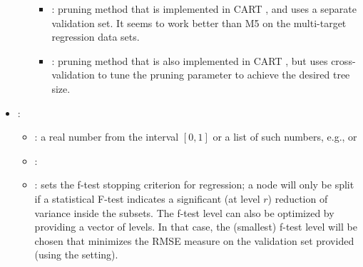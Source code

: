 \begin{itemize}
\begin{itemize}
\begin{itemize}
                    \item{}: pruning method that is implemented in CART \cite{Breiman1984}, and uses a separate validation set. It seems to work better than M5 on the multi-target regression data sets.
                    \item{}: pruning method that is also implemented in CART \cite{Breiman1984}, but uses cross-validation to tune the pruning parameter to achieve the desired tree size.
                \end{itemize}
           \end{itemize}
    \item {}:
           \begin{itemize}
                \item \optionPossibleValues{}: a real number from the interval $[0, 1]$ or a list of such numbers, e.g.,  or \formatOneElement{[0.001,0.005,0.01,0.05,0.1,0.125]}
                \item \optionDefaultValue{}: 
                \item \optionDescrption{}: sets the f-test stopping criterion for regression; a node will only be split if a statistical F-test indicates a significant (at level $r$) reduction of variance inside the subsets. The f-test level can also be optimized by providing a vector of levels. In that case, the (smallest) f-test level will be chosen that minimizes the RMSE measure on the validation set provided (using the  setting).

\end{itemize}
\end{itemize}
